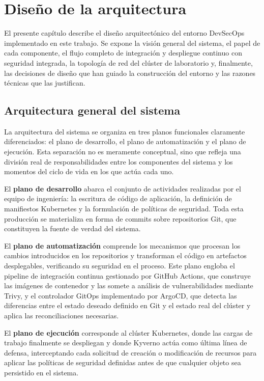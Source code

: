 \chapter{Diseño de la arquitectura}

El presente capítulo describe el diseño arquitectónico del entorno DevSecOps implementado en este trabajo. Se expone la visión general del sistema, el papel de cada componente, el flujo completo de integración y despliegue continuo con seguridad integrada, la topología de red del clúster de laboratorio y, finalmente, las decisiones de diseño que han guiado la construcción del entorno y las razones técnicas que las justifican.

\section{Arquitectura general del sistema}

La arquitectura del sistema se organiza en tres planos funcionales claramente diferenciados: el plano de desarrollo, el plano de automatización y el plano de ejecución. Esta separación no es meramente conceptual, sino que refleja una división real de responsabilidades entre los componentes del sistema y los momentos del ciclo de vida en los que actúa cada uno.

El \textbf{plano de desarrollo} abarca el conjunto de actividades realizadas por el equipo de ingeniería: la escritura de código de aplicación, la definición de manifiestos Kubernetes y la formulación de políticas de seguridad. Toda esta producción se materializa en forma de commits sobre repositorios Git, que constituyen la fuente de verdad del sistema.

El \textbf{plano de automatización} comprende los mecanismos que procesan los cambios introducidos en los repositorios y transforman el código en artefactos desplegables, verificando su seguridad en el proceso. Este plano engloba el pipeline de integración continua gestionado por GitHub Actions, que construye las imágenes de contenedor y las somete a análisis de vulnerabilidades mediante Trivy, y el controlador GitOps implementado por ArgoCD, que detecta las diferencias entre el estado deseado definido en Git y el estado real del clúster y aplica las reconciliaciones necesarias.

El \textbf{plano de ejecución} corresponde al clúster Kubernetes, donde las cargas de trabajo finalmente se despliegan y donde Kyverno actúa como última línea de defensa, interceptando cada solicitud de creación o modificación de recursos para aplicar las políticas de seguridad definidas antes de que cualquier objeto sea persistido en el sistema.

